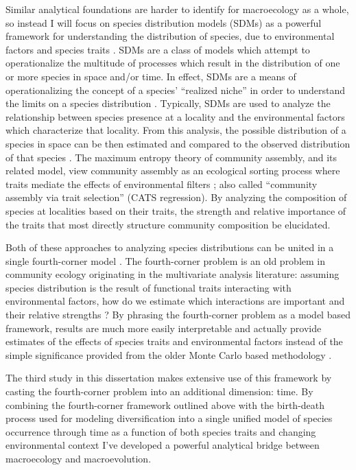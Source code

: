 Similar analytical foundations are harder to identify for macroecology as a whole, so instead I will focus on species distribution models (SDMs) as a powerful framework for understanding the distribution of species, due to environmental factors \citep{Elith2009} and species traits \citep{Shipley2006}. SDMs are a class of models which attempt to operationalize the multitude of processes which result in the distribution of one or more species in space and/or time. In effect, SDMs are a means of operationalizing the concept of a species' ``realized niche'' in order to understand the limits on a species distribution \citep{Elith2009}. Typically, SDMs are used to analyze the relationship between species presence at a locality and the environmental factors which characterize that locality. From this analysis, the possible distribution of a species in space can be then estimated and compared to the observed distribution of that species \citep{Elith2009,Austin2006,Phillips2006a}. The maximum entropy theory of community assembly, and its related model, view community assembly as an ecological sorting process where traits mediate the effects of environmental filters \citep{Shipley2006,Warton2015a}; also called ``community assembly via trait selection'' (CATS regression). By analyzing the composition of species at localities based on their traits, the strength and relative importance of the traits that most directly structure community composition be elucidated. 

Both of these approaches to analyzing species distributions can be united in a single fourth-corner model \citep{Warton2015a,Brown2014c}. The fourth-corner problem is an old problem in community ecology originating in the multivariate analysis literature: assuming species distribution is the result of functional traits interacting with environmental factors, how do we estimate which interactions are important and their relative strengths \citep{Legendre1997,Dray2008}? By phrasing the fourth-corner problem as a model based framework, results are much more easily interpretable and actually provide estimates of the effects of species traits and environmental factors instead of the simple significance provided from the older Monte Carlo based methodology \citep{Brown2014c,Jamil2013,Pollock2012,Pollock2015}.

The third study in this dissertation makes extensive use of this framework by casting the fourth-corner problem into an additional dimension: time. By combining the fourth-corner framework outlined above \citep{Warton2015a,Brown2014c} with the birth-death process used for modeling diversification into a single unified model of species occurrence through time as a function of both species traits and changing environmental context I've developed a powerful analytical bridge between macroecology and macroevolution.

